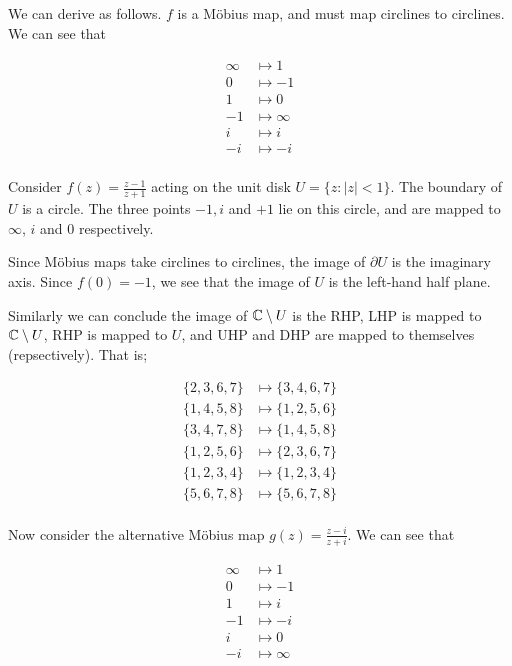 \documentclass[a4paper]{article}
\begin{document}
We can derive as follows. $ f $ is a M\"obius map, and must map circlines to circlines. We can see that 


\begin{align*}
\infty & \mapsto 1 \\
0 & \mapsto -1 \\
1 & \mapsto 0 \\
-1 & \mapsto \infty \\
i & \mapsto i \\
-i & \mapsto -i \\ 
\end{align*}

Consider $f(z) = \frac{z - 1}{z + 1}$ acting on the unit disk $U = \{z: |z| < 1\}$. The boundary of $U$ is a circle. The three points $-1, i$ and $+1$ lie on this circle, and are mapped to $\infty$, $i$ and $0$ respectively.

Since M\"obius maps take circlines to circlines, the image of $\partial U$ is the imaginary axis. Since $f(0) = -1$, we see that the image of $U$ is the left-hand half plane.

Similarly we can conclude the image of $ \mathbb{C} \setminus U $ is the RHP, LHP is mapped to $ \mathbb{C} \setminus U $, RHP is mapped to $ U $, and  UHP and DHP are mapped to themselves (repsectively). That is;

\begin{align*}
\{2,3,6,7\} & \mapsto \{3,4,6,7  \} \\
\{ 1,4,5,8 \} & \mapsto \{  1,2,5,6 \}\\
\{ 3,4,7,8 \} & \mapsto \{  1,4,5,8 \}\\
\{ 1,2,5,6 \} & \mapsto \{  2,3,6,7 \}\\
\{ 1,2,3,4 \} & \mapsto \{  1,2,3,4 \}\\
\{ 5,6,7,8 \} & \mapsto \{  5,6,7,8 \}\\
\end{align*}

Now consider the alternative M\"obius map $ g(z) = \frac{z - i}{z + i} $. We can see that 


\begin{align*}
\infty & \mapsto 1 \\
0 & \mapsto -1 \\
1 & \mapsto i \\
-1 & \mapsto -i \\
i & \mapsto 0 \\
-i & \mapsto \infty \\ 
\end{align*}
\end{document}
